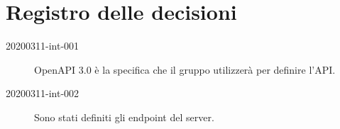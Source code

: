\documentclass{article}
\begin{document}
\section{Registro delle decisioni}%
\label{sec:registro_delle_decisioni}

\begin{description}
  \item[20200311-int-001] OpenAPI 3.0 è la specifica che il gruppo utilizzerà per definire l'API\@.
  \item[20200311-int-002] Sono stati definiti gli endpoint del server.
\end{description}

\end{document}
